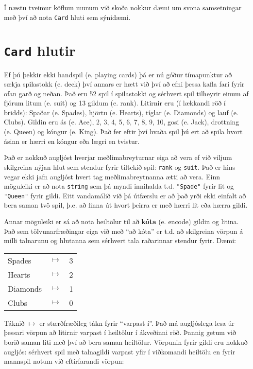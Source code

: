 Í næstu tveimur köflum munum við skoða nokkur dæmi um svona samsetningar með því að nota {\tt Card} hluti sem sýnidæmi. 

\section{{\tt Card} hlutir}

Ef þú þekkir ekki handspil (e. playing cards) þá er nú góður tímapunktur að sækja spilastokk (e. deck) því annars er hætt við því að efni þessa kafla fari fyrir ofan garð og neðan.
Það eru 52 spil í spilastokki og sérhvert spil tilheyrir einum af fjórum litum (e. suit) og 13 gildum (e. rank).
Litirnir eru (í lækkandi röð í bridds): Spaðar (e. Spades), hjörtu (e. Hearts), tíglar (e. Diamonds) og lauf (e. Clubs).
Gildin eru ás (e. Ace), 2, 3, 4, 5, 6, 7, 8, 9, 10, gosi (e. Jack), drottning (e. Queen) og kóngur (e. King).
Það fer eftir því hvaða spil þú ert að spila hvort ásinn er hærri en kóngur eða lægri en tvistur.


Það er nokkuð augljóst hverjar meðlimabreyturnar eiga að vera ef við viljum skilgreina nýjan hlut sem stendur fyrir tiltekið spil: {\tt rank} og {\tt suit}.
Það er hins vegar ekki jafn augljóst hvert tag meðlimabreytnanna ætti að vera.
Einn möguleiki er að nota {\tt string} sem þá myndi innihalda t.d. \verb+"Spade"+ fyrir lit og \verb+"Queen"+ fyrir gildi.
Eitt vandamálið við þá útfærslu er að það yrði ekki einfalt að bera saman tvö spil, þ.e. að finna út hvort þeirra er með hærri lit eða hærra gildi.


Annar möguleiki er sá að nota heiltölur til að {\bf kóta} (e. encode) gildin og litina. 
Það sem tölvunarfræðingar eiga við með ``að kóta'' er t.d. að skilgreina vörpun á milli talnarunu og hlutanna sem sérhvert tala raðarinnar stendur fyrir.
Dæmi:

\vspace{0.1in}
\begin{tabular}{l c l}
Spades & $\mapsto$ & 3 \\
Hearts & $\mapsto$ & 2 \\
Diamonds & $\mapsto$ & 1 \\
Clubs & $\mapsto$ & 0
\end{tabular}
\vspace{0.1in}

Táknið $\mapsto$ er stærðfræðileg tákn fyrir ``varpast í''. 
Það má augljóslega lesa úr þessari vörpun að litirnir varpast í heiltölur í ákveðinni röð.
Þannig getum við borið saman liti með því að bera saman heiltölur.
Vörpunin fyrir gildi eru nokkuð augljós: sérhvert spil með talnagildi varpast yfir í viðkomandi heiltölu en fyrir mannspil notum við eftirfarandi vörpun:

